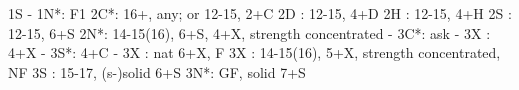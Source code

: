 1S - 1N*: F1
2C*: 16+, any; or 12-15, 2+C
2D : 12-15, 4+D
2H : 12-15, 4+H
2S : 12-15, 6+S
2N*: 14-15(16), 6+S, 4+X, strength concentrated
   - 3C*: ask
        - 3X : 4+X
        - 3S*: 4+C
   - 3X : nat 6+X, F
3X : 14-15(16), 5+X, strength concentrated, NF
3S : 15-17, (s-)solid 6+S
3N*: GF, solid 7+S
